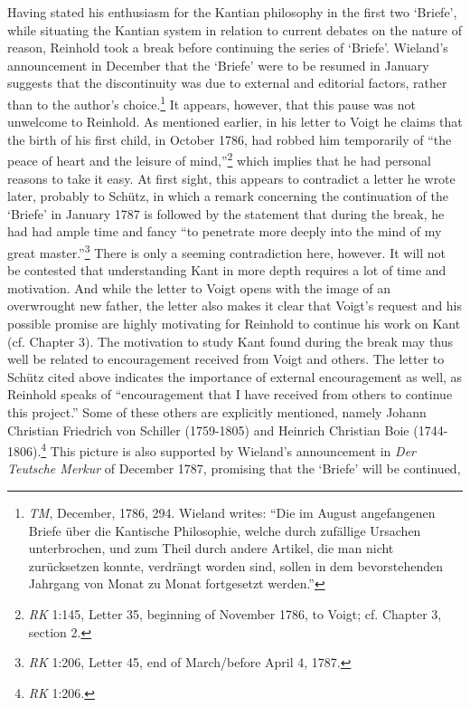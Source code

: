 Having stated his enthusiasm for the Kantian philosophy in the first two `Briefe', while situating the Kantian system in relation to current debates on the nature of reason, Reinhold took a break before continuing the series of `Briefe'. Wieland's announcement in December that the `Briefe' were to be resumed in January suggests that the discontinuity was due to external and editorial factors, rather than to the author's choice.\footnote{ \textit{TM}, December, 1786, 294. Wieland writes: ``Die im August angefangenen Briefe \"{u}ber die Kantische Philosophie, welche durch zuf\"{a}llige Ursachen unterbrochen, und zum Theil durch andere Artikel, die man nicht zur\"{u}cksetzen konnte, verdr\"{a}ngt worden sind, sollen in dem bevorstehenden Jahrgang von Monat zu Monat fortgesetzt werden.''} It appears, however, that this pause was not unwelcome to Reinhold. As mentioned earlier, in his letter to Voigt he claims that the birth of his first child, in October 1786, had robbed him temporarily of ``the peace of heart and the leisure of mind,''\footnote{ \textit{RK} 1:145, Letter 35, beginning of November 1786, to Voigt; cf. Chapter 3, section 2.} which implies that he had personal reasons to take it easy. At first sight, this appears to contradict a letter he wrote later, probably to Sch\"{u}tz, in which a remark concerning the continuation of the `Briefe' in January 1787 is followed by the statement that during the break, he had had ample time and fancy ``to penetrate more deeply into the mind of my great master.''\footnote{ \textit{RK} 1:206, Letter 45, end of March/before April 4, 1787. } There is only a seeming contradiction here, however. It will not be contested that understanding Kant in more depth requires a lot of time and motivation. And while the letter to Voigt opens with the image of an overwrought new father, the letter also makes it clear that Voigt's request and his possible promise are highly motivating for Reinhold to continue his work on Kant (cf. Chapter 3). The motivation to study Kant found during the break may thus well be related to encouragement received from Voigt and others. The letter to Sch\"{u}tz cited above indicates the importance of external encouragement as well, as Reinhold speaks of ``encouragement that I have received from others to continue this project.'' Some of these others are explicitly mentioned, namely Johann Christian Friedrich von Schiller (1759{-}1805) and Heinrich Christian Boie (1744{-}1806).\footnote{ \textit{RK} 1:206. } This picture is also supported by Wieland's announcement in \textit{Der Teutsche Merkur} of December 1787, promising that the `Briefe' will be continued, 

